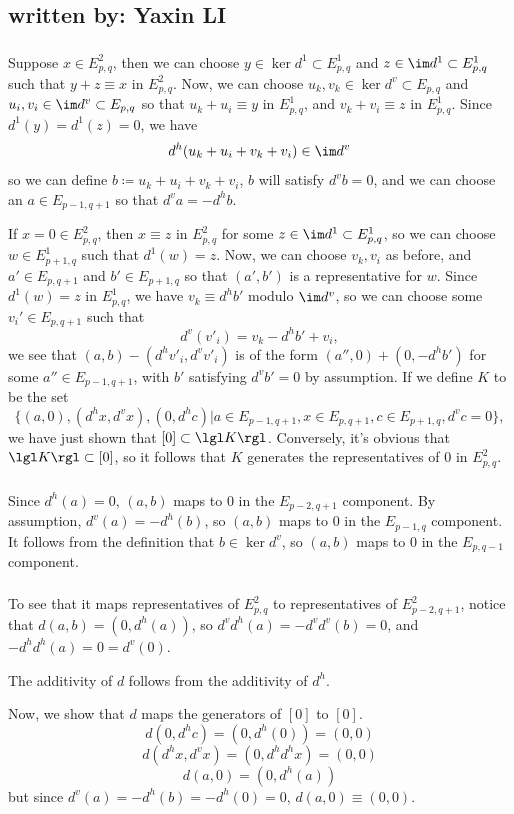 \subsection{written by: Yaxin LI}
\subsubsection{} \label{ex5.1.2(1)}
Suppose $x\in E^2_{p,q}$, then we can choose $y\in\ker d^1\subset E^1_{p,q}$ and $z\in\im d^1\subset E^1_{p,q}$ such that $y+z\equiv x$ in $E^2_{p,q}$. Now, we can choose $u_k,v_k\in\ker d^v\subset E_{p,q}$ and $u_i,v_i\in\im d^v\subset E_{p,q}$ so that $u_k+u_i\equiv y$ in $E^1_{p,q}$, and $v_k+v_i\equiv z$ in $E^1_{p,q}$. Since $d^1(y)=d^1(z)=0$, we have
\[d^h(u_k+u_i+v_k+v_i)\in\im d^v\]
so we can define $b\coloneqq u_k+u_i+v_k+v_i$, $b$ will satisfy $d^vb=0$, and we can choose an $a\in E_{p-1,q+1}$ so that $d^va=-d^hb$.

If $x=0\in E^2_{p,q}$, then $x\equiv z$ in $E^2_{p,q}$ for some $z\in\im d^1\subset E^1_{p,q}$, so we can choose $w\in E^1_{p+1,q}$ such that $d^1(w)=z$. Now, we can choose $v_k,v_i$ as before, and $a'\in E_{p,q+1}$ and $b'\in E_{p+1,q}$ so that $(a',b')$ is a representative for $w$. Since $d^1(w)=z$ in $E^1_{p,q}$, we have $v_k\equiv d^hb'$ modulo $\im d^v$, so we can choose some $v_i'\in E_{p,q+1}$ such that
\[d^v(v'_i)=v_k-d^hb'+v_i,\]
we see that $(a,b)-(d^hv'_i,d^vv'_i)$ is of the form $(a'',0)+(0,-d^hb')$ for some $a''\in E_{p-1,q+1}$, with $b'$ satisfying $d^vb'=0$ by assumption. If we define $K$ to be the set
\[\{(a,0),(d^hx,d^vx),(0,d^hc)| a\in E_{p-1,q+1}, x\in E_{p,q+1}, c\in E_{p+1,q}, d^vc=0\},\]
we have just shown that $[0]\subset \lgl K\rgl$. Conversely, it's obvious that $\lgl K\rgl\subset[0]$, so it follows that $K$ generates the representatives of $0$ in $E^2_{p,q}$.
\subsubsection{} \label{ex5.1.2(2)}
Since $d^h(a)=0$, $(a,b)$ maps to $0$ in the $E_{p-2,q+1}$ component. By assumption, $d^v(a)=-d^h(b)$, so $(a,b)$ maps to $0$ in the $E_{p-1,q}$ component. It follows from the definition that $b\in\ker d^v$, so $(a,b)$ maps to $0$ in the $E_{p,q-1}$ component.
\subsubsection{} \label{ex5.1.2(3)}
To see that it maps representatives of $E^2_{p,q}$ to representatives of $E^2_{p-2,q+1}$, notice that $d(a,b)=(0,d^h(a))$, so $d^vd^h(a)=-d^vd^v(b)=0$, and $-d^hd^h(a)=0=d^v(0)$.

The additivity of $d$ follows from the additivity of $d^h$.

Now, we show that $d$ maps the generators of $[0]$ to $[0]$.
\[d(0,d^hc)=(0,d^h(0))=(0,0)\]
\[d(d^hx,d^vx)=(0,d^hd^hx)=(0,0)\]
\[d(a,0)=(0,d^h(a))\]
but since $d^v(a)=-d^h(b)=-d^h(0)=0$, $d(a,0)\equiv(0,0)$.